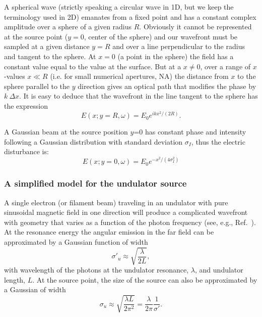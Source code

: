 \documentclass{iucr}
\begin{document}
A spherical wave (strictly speaking a circular wave in 1D, but we keep the terminology used in 2D) emanates from a fixed point and has a constant complex amplitude over a sphere of a given radius $R$. Obviously it cannot be represented at the source point ($y=0$, center of the sphere) and our wavefront must be sampled at a given distance $y=R$ and over a line perpendicular to the radius and tangent to the sphere. At $x=0$ (a point in the sphere) the field has a constant value equal to the value at the surface. But at a $x{\ne}0$, over a range of $x$-values $x{\ll}R$ (i.e. for small numerical apertures, NA) the distance from $x$ to the sphere parallel to the $y$ direction gives an optical path that modifies the phase by $k ~\Delta x$. It is easy to deduce that the wavefront in the line tangent to the sphere has the expression
\begin{equation}
\label{eq:sphericalWave}
    E(x;y=R,\omega)  = E_0 e^{i k x^2 / (2 R)}.
\end{equation}


A Gaussian beam at the source position $y$=0 has constant phase and intensity following a Gaussian distribution with standard deviation $\sigma_I$, thus the electric disturbance is: 
\begin{equation}
\label{eq:gaussianSource}
    E(x;y=0,\omega) = E_0 e^{-x^2 / (4 \sigma_I^2)}
\end{equation}


\subsubsection{A simplified model for the undulator source}
\label{sec:undulator}

A single electron (or filament beam) traveling in an undulator with pure sinusoidal magnetic field in one direction will produce a complicated wavefront with geometry that varies as a function of the photon frequency (see, e.g., Ref.~\cite{elleaume}). At the resonance energy the angular emission in the far field can be approximated by a Gaussian function of width \cite{elleaume}
\begin{equation}
\label{eq:undulatorDivergence}
    \sigma'_u \approx\sqrt{\frac{\lambda}{2 L}},
\end{equation}
with wavelength of the photons at the undulator resonance, $\lambda$, and undulator length, $L$. At the source point, the size of the source can also be approximated by a Gaussian of width
\begin{equation}
\label{eq:undulatorSize}
    \sigma_u \approx\sqrt{\frac{\lambda L}{2 \pi^2}} = \frac{\lambda}{2 \pi} \frac{1}{\sigma'}.
\end{equation}
\end{document}
